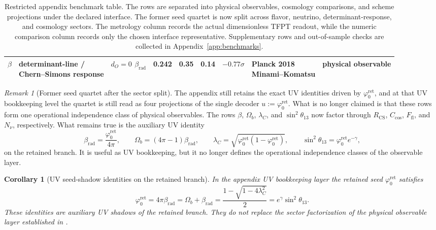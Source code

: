 \documentclass[11pt,a4paper]{article}
\newtheorem{corollary}[theorem]{Corollary}
\theoremstyle{definition}
\theoremstyle{remark}
\newtheorem*{remark}{Remark}
\newcommand{\phiz}{\varphi_0^{\mathrm{ret}}}
\begin{document}
\begin{table}[t]
{\begin{tabular}{@{}lllrrrrll@{}}
$\beta$ & \makecell[l]{determinant-line /\\Chern--Simons response} & \makecell[l]{$d_O=0$\\$\beta_{\mathrm{rad}}$} & \num{0.242} & \num{0.35} & \num{0.14} & $-0.77\sigma$ & \makecell[l]{Planck 2018\\Minami--Komatsu} & physical observable \\
\bottomrule
\end{tabular}}
\caption{Restricted appendix benchmark table. The rows are separated into physical observables,
cosmology comparisons, and scheme projections under the declared interface. The former seed quartet
is now split across flavor, neutrino, determinant-response, and cosmology sectors. The metrology
column records the actual dimensionless TFPT readout, while the numeric comparison column records
only the chosen interface representative. Supplementary rows and out-of-sample checks are collected
in Appendix~\ref{app:benchmarks}.}
\label{tab:benchmark}
\end{table}

\begin{remark}[Former seed quartet after the sector split]
The appendix still retains the exact UV identities driven by $\phiz$, and at that UV bookkeeping
level the quartet is still read as four projections of the single decoder $u:=\phiz$. What is no
longer claimed is that these rows form one operational independence class of physical observables.
The rows $\beta$, $\Omega_b$, $\lambda_C$, and $\sin^2\theta_{13}$ now factor through
$R_{\mathrm{CS}}$, $C_{\mathrm{cos}}$, $F_{\mathrm{fl}}$, and $N_\nu$, respectively. What remains
true is the auxiliary UV identity
\[
\beta_{\mathrm{rad}}=\frac{\phiz}{4\pi},
\qquad
\Omega_b=(4\pi-1)\beta_{\mathrm{rad}},
\qquad
\lambda_C=\sqrt{\phiz(1-\phiz)},
\qquad
\sin^2\theta_{13}=\phiz e^{-\gamma},
\]
on the retained branch. It is useful as UV bookkeeping, but it no longer defines the operational
independence classes of the observable layer.
\end{remark}

\begin{corollary}[UV seed-shadow identities on the retained branch]
\label{cor:retained-seed-factorization}
In the appendix UV bookkeeping layer the retained seed $\phiz$ satisfies
\[
\phiz
=
4\pi\beta_{\mathrm{rad}}
=
\Omega_b+\beta_{\mathrm{rad}}
=
\frac{1-\sqrt{1-4\lambda_C^2}}{2}
=
e^{\gamma}\sin^2\theta_{13}.
\]
These identities are auxiliary UV shadows of the retained branch. They do not replace the sector
factorization of the physical observable layer established in
.
\end{corollary}
\end{document}
